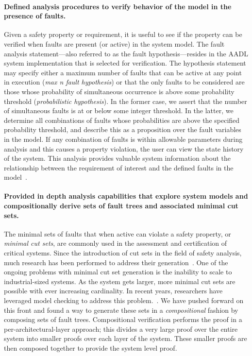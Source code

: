 \paragraph{Defined analysis procedures to verify behavior of the model in the presence of faults.}
Given a safety property or requirement, it is useful to see if the property can be verified when faults are present (or active) in the system model. The fault analysis statement---also referred to as the fault hypothesis---resides in the AADL system implementation that is selected for verification. The hypothesis statement may specify either a maximum number of faults that can be active at any point in execution (\emph{max n fault hypothesis}) or that the only faults to be considered are those whose probability of simultaneous occurrence is above some probability threshold (\emph{probabilistic hypothesis}).  In the former case, we assert that the number of simultaneous faults is at or below some integer threshold.  In the latter, we determine all combinations of faults whose probabilities are above the specified probability threshold, and describe this as a proposition over the fault variables in the model. If any combination of faults is within allowable parameters during analysis and this causes a property violation, the user can view the state history of the system. This analysis provides valuable system information about the relationship between the requirement of interest and the defined faults in the model~\cite{stewart2020safety,stewart2021safety}. 

\paragraph{Provided in depth analysis capabilities that explore system models and compositionally derive sets of fault trees and associated minimal cut sets.}
The minimal sets of faults that when active can violate a safety property, or {\em minimal cut sets}, are commonly used in the assessment and certification of critical systems. Since the introduction of cut sets in the field of safety analysis, much research has been performed to address their generation~\cite{fta:survey,rauzy1993new,historyFTA,Bozzano:2010:DSA:1951720,rausand2003system}. One of the ongoing problems with minimal cut set generation is the inability to scale to industrial-sized systems. As the system gets larger, more minimal cut sets are possible with ever increasing cardinality. In recent years, researchers have leveraged model checking to address this problem.~\cite{bieber2002combination,schafer2003combining,fta:survey,contractBasedDesign,symbFTA,DBLP:conf/cav/BozzanoCPJKPRT15}. We have pushed forward on this front and found a way to generate these sets in a \emph{compositional} fashion by composing sets of fault trees. Compositional verification performs the proof in a per-architectural-layer approach; this divides a very large proof over the entire system into smaller proofs over each layer of the system. These smaller proofs are then composed together to provide the system level proof. 

